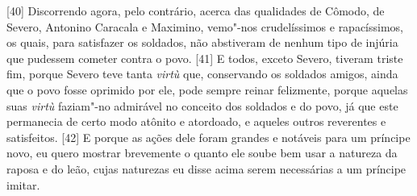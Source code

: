 {[}40{]} Discorrendo agora, pelo contrário, acerca das qualidades de
Cômodo, de Severo, Antonino Caracala e Maximino, vemo"-nos crudelíssimos
e rapacíssimos, os quais, para satisfazer os soldados, não abstiveram de
nenhum tipo de injúria que pudessem cometer contra o povo. {[}41{]} E
todos, exceto Severo, tiveram triste fim, porque Severo teve tanta
\emph{virtù} que, conservando os soldados amigos, ainda que o povo fosse
oprimido por ele, pode sempre reinar felizmente, porque aquelas suas
\emph{virtù} faziam"-no admirável no conceito dos soldados e do povo, já
que este permanecia de certo modo atônito e atordoado, e aqueles outros
reverentes e satisfeitos. {[}42{]} E porque as ações dele foram grandes
e notáveis para um príncipe novo, eu quero mostrar brevemente o quanto
ele soube bem usar a natureza da raposa e do leão, cujas naturezas eu
disse acima serem necessárias a um
príncipe imitar.

